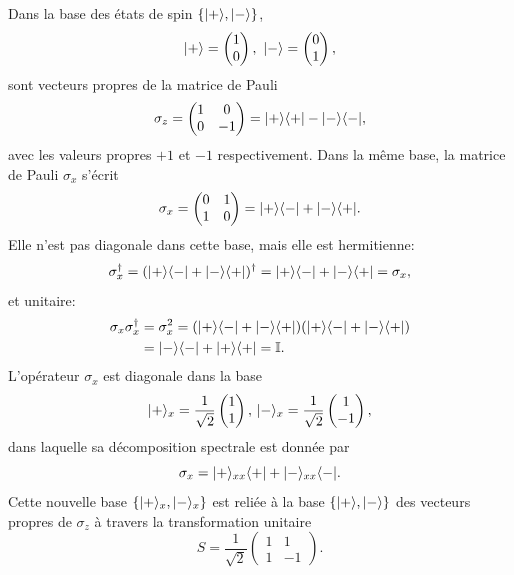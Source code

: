 \begin{example}
Dans la base des états de spin $\{\vert+\rangle,\vert-\rangle\}$,
\begin{equation}
\vert+\rangle=\begin{pmatrix}
1\\
0
\end{pmatrix},\ \vert-\rangle=\begin{pmatrix}
0\\
1
\end{pmatrix} ,
\end{equation}
sont vecteurs propres de la matrice de Pauli%
\begin{equation}
\sigma_{z}=\begin{pmatrix}
1 & 0\\
0 & -1
\end{pmatrix}=\vert+\rangle\langle+\vert -\vert-\rangle\langle-\vert,
\end{equation}
avec les valeurs propres $+1$ et $-1$ respectivement. Dans la même base, la
matrice de Pauli $\sigma_{x}$ s'écrit%
\begin{equation}
\sigma_{x}=\begin{pmatrix}
0 & 1\\
1 & 0
\end{pmatrix}=\vert+\rangle\langle-\vert +\vert-\rangle\langle+\vert.
\end{equation}
Elle n'est pas diagonale dans cette base, mais elle est hermitienne:
\begin{equation}
\sigma_{x}^{\dag}=(\vert+\rangle\langle-\vert+\vert-\rangle\langle+\vert)^{\dag}
=\vert+\rangle\langle-\vert+\vert-\rangle\langle+\vert=\sigma_{x},
\end{equation}
et unitaire:%
\begin{equation}%
\begin{split}
\sigma_{x}\sigma_{x}^{\dag}  &  =\sigma_{x}^{2}=(\ket{+}\bra{-}+\ket{-}\bra{+})
(\ket{+}\bra{-}+\ket{-}\bra{+}) \\
&  =\ket{-}\bra{-}+\ket{+}\bra{+} =\mathbb{I}.
\end{split}%
\end{equation}%
L'opérateur $\sigma_{x}$ est diagonale dans la base
\begin{equation}
\vert+\rangle_{x}=\frac{1}{\sqrt{2}}\begin{pmatrix}
1\\
1
\end{pmatrix},\,\vert-\rangle_{x} =\frac{1}{\sqrt{2}}\begin{pmatrix}
1\\
-1
\end{pmatrix} ,
\end{equation}
dans laquelle sa décomposition spectrale est donnée par%
\begin{equation}
\sigma_{x}=\vert+\rangle_{xx}\langle+\vert+\vert-\rangle_{xx}\langle-\vert.
\end{equation}
Cette nouvelle base $\{\vert+\rangle_{x},\vert-\rangle_{x}\}$ est reliée à la base
$\{\vert+\rangle,\vert-\rangle\}$ des vecteurs propres de $\sigma_{z}$ à travers la
transformation unitaire%
\begin{equation}
S=\frac{1}{\sqrt{2}}\begin{pmatrix}
1 & 1\\
1 & -1
\end{pmatrix} .
\end{equation}


\end{example}
